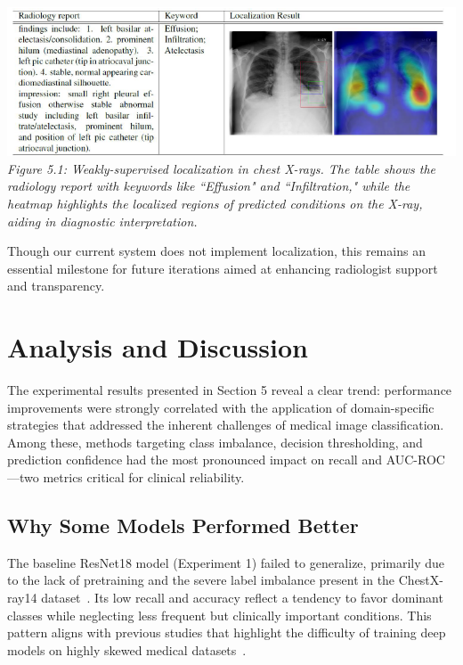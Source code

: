 \documentclass[12pt]{article}
\begin{document}
\begin{multicols}{2}
\begin{center}
    \includegraphics[width=\linewidth]{figure5.1.png}
    \\[1em]
    \textit{Figure 5.1: Weakly-supervised localization in chest X-rays. The table shows the radiology report with keywords like ``Effusion" and ``Infiltration," while the heatmap highlights the localized regions of predicted conditions on the X-ray, aiding in diagnostic interpretation.}
\end{center}

Though our current system does not implement localization, this remains an essential milestone for future iterations aimed at enhancing radiologist support and transparency.

\section{Analysis and Discussion}

The experimental results presented in Section 5 reveal a clear trend: performance improvements were strongly correlated with the application of domain-specific strategies that addressed the inherent challenges of medical image classification. Among these, methods targeting class imbalance, decision thresholding, and prediction confidence had the most pronounced impact on recall and AUC-ROC---two metrics critical for clinical reliability.

\subsection{Why Some Models Performed Better}
The baseline ResNet18 model (Experiment 1) failed to generalize, primarily due to the lack of pretraining and the severe label imbalance present in the ChestX-ray14 dataset~\cite{wang2017chestx}. Its low recall and accuracy reflect a tendency to favor dominant classes while neglecting less frequent but clinically important conditions. This pattern aligns with previous studies that highlight the difficulty of training deep models on highly skewed medical datasets~\cite{irvin2019chexpert}.


\end{multicols}
\end{document}
